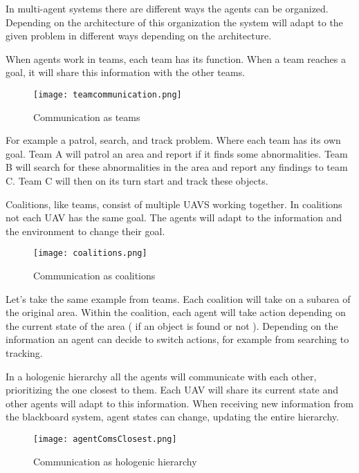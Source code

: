 
In multi-agent systems there are different ways the agents can be organized. 
Depending on the architecture of this organization the system will adapt to 
the given problem in different ways depending on the architecture. 

When agents work in teams, each team has its function. When a team reaches a goal, it will share this information with the other teams.
\begin{figure}[ht]
    \centering
    \texttt{[image: teamcommunication.png]}
    \caption[Communication as teams]{Communication as teams}
\end{figure}

For example a patrol, search, and track problem. Where each team has its own goal. 
Team A will patrol an area and report if it finds some abnormalities. Team B will search for these abnormalities in the area and report any findings to team C. 
Team C will then on its turn start and track these objects.

Coalitions, like teams, consist of multiple UAVS working together. In coalitions not each UAV has the same goal. 
The agents will adapt to the information and the environment to change their goal.

\newpage

\begin{figure}[ht]
    \centering
    \texttt{[image: coalitions.png]}
    \caption[Communication as coalitions]{Communication as coalitions}
\end{figure}
Let’s take the same example from teams. Each coalition will take on a subarea of the original area. Within the coalition, 
each agent will take action depending on the current state of the area ( if an object is found or not ). 
Depending on the information an agent can decide to switch actions, for example from searching to tracking.

In a hologenic hierarchy all the agents will communicate with each other, prioritizing the one closest to them. 
Each UAV will share its current state and other agents will adapt to this information. When receiving new information 
from the blackboard system, agent states can change, updating the entire hierarchy. 

\begin{figure}[ht]
    \centering
    \texttt{[image: agentComsClosest.png]}
    \caption[Communication as hologenic hierarchy]{Communication as hologenic hierarchy}
\end{figure}